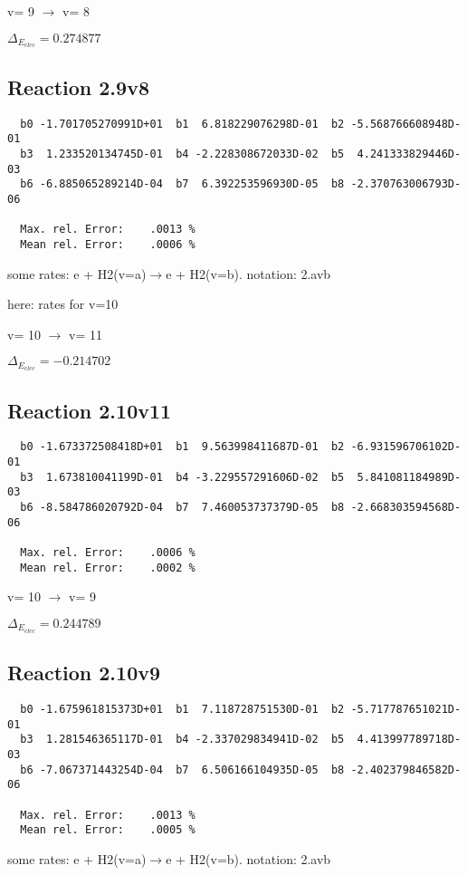 \documentclass[12pt]{article}
\begin{document}
  v=  9 $\rightarrow$ v= 8

$\Delta_{E_{elec}}= 0.274877$


\subsection{
Reaction 2.9v8
}


\begin{small}\begin{verbatim}
  b0 -1.701705270991D+01  b1  6.818229076298D-01  b2 -5.568766608948D-01
  b3  1.233520134745D-01  b4 -2.228308672033D-02  b5  4.241333829446D-03
  b6 -6.885065289214D-04  b7  6.392253596930D-05  b8 -2.370763006793D-06

  Max. rel. Error:    .0013 %
  Mean rel. Error:    .0006 %

\end{verbatim}\end{small}
\newpage
some rates: e + H2(v=a)$\rightarrow$e + H2(v=b). notation: 2.avb

here: rates for v=10


  v=  10 $\rightarrow$ v= 11

$\Delta_{E_{elec}}=-0.214702$


\subsection{
Reaction 2.10v11
}


\begin{small}\begin{verbatim}
  b0 -1.673372508418D+01  b1  9.563998411687D-01  b2 -6.931596706102D-01
  b3  1.673810041199D-01  b4 -3.229557291606D-02  b5  5.841081184989D-03
  b6 -8.584786020792D-04  b7  7.460053737379D-05  b8 -2.668303594568D-06

  Max. rel. Error:    .0006 %
  Mean rel. Error:    .0002 %

\end{verbatim}\end{small}

  v=  10 $\rightarrow$ v= 9

$\Delta_{E_{elec}}= 0.244789$


\subsection{
Reaction 2.10v9
}


\begin{small}\begin{verbatim}
  b0 -1.675961815373D+01  b1  7.118728751530D-01  b2 -5.717787651021D-01
  b3  1.281546365117D-01  b4 -2.337029834941D-02  b5  4.413997789718D-03
  b6 -7.067371443254D-04  b7  6.506166104935D-05  b8 -2.402379846582D-06

  Max. rel. Error:    .0013 %
  Mean rel. Error:    .0005 %

\end{verbatim}\end{small}
\newpage
some rates: e + H2(v=a)$\rightarrow$e + H2(v=b). notation: 2.avb
\end{document}
